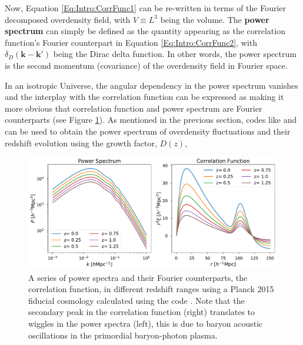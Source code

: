 \qquad Now, Equation \eqref{Eq:Intro:CorrFunc1} can be re-written in terms of the Fourier decomposed overdensity field,
with $V \equiv L^3$ being the volume. The \textbf{power spectrum} can simply be defined as the quantity appearing as the correlation function's Fourier counterpart in Equation \eqref{Eq:Intro:CorrFunc2},
with $\delta_D(\textbf{k} - \textbf{k}')$ being the Dirac delta function. In other words, the power spectrum is the second momentum (covariance) of the overdensity field in Fourier space. 

\qquad In an isotropic Universe, the angular dependency in the power spectrum vanishes and the interplay with the correlation function can be expressed as
making it more obvious that correlation function and power spectrum are Fourier counterparts (see Figure \ref{fig:Pk_Cf}). %
As mentioned in the previous section, codes like \camb and \class can be used to obtain the power spectrum of overdensity fluctuations and their redshift evolution using the growth factor, $D(z)$,

\begin{figure}
\begin{center}
\includegraphics[width=\textwidth]{Intro-FIGS/Pk_Cf}
\caption[Power spectra and correlation functions calculated using the \class code.]{A series of power spectra and their Fourier counterparts, the correlation function, in different redshift ranges using a Planck 2015 fiducial cosmology \citep{PlanckResults2015} calculated using the \class code \citep{Class}. Note that the secondary peak in the correlation function (right) translates to wiggles in the power spectra (left), this is due to baryon acoustic oscillations in the primordial baryon-photon plasma.}
\label{fig:Pk_Cf}
\end{center}
\end{figure}

